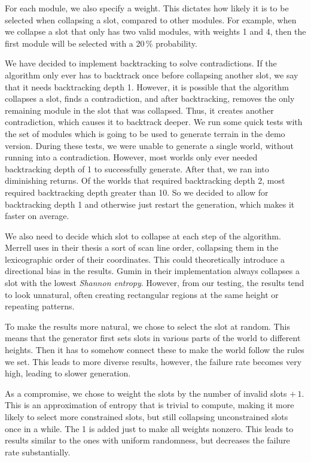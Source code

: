 For each module, we also specify a weight.
This dictates how likely it is to be selected when collapsing a slot, compared to other modules.
For example, when we collapse a slot that only has two valid modules, with weights 1 and 4, then the first module will be selected with a 20\,\% probability.

We have decided to implement backtracking to solve contradictions.
If the algorithm only ever has to backtrack once before collapsing another slot, we say that it needs backtracking depth 1.
However, it is possible that the algorithm collapses a slot, finds a contradiction, and after backtracking, removes the only remaining module in the slot that was collapsed.
Thus, it creates another contradiction, which causes it to backtrack deeper.
We run some quick tests with the set of modules which is going to be used to generate terrain in the demo version.
During these tests, we were unable to generate a single world, without running into a contradiction.
However, most worlds only ever needed backtracking depth of 1 to successfully generate.
After that, we ran into diminishing returns.
Of the worlds that required backtracking depth 2, most required backtracking depth greater than 10.
So we decided to allow for backtracking depth 1 and otherwise just restart the generation, which makes it faster on average.


We also need to decide which slot to collapse at each step of the algorithm.
Merrell uses in their thesis a sort of scan line order, collapsing them in the lexicographic order of their coordinates.
This could theoretically introduce a directional bias in the results.
Gumin in their implementation always collapses a slot with the lowest \emph{Shannon entropy}.
However, from our testing, the results tend to look unnatural, often creating rectangular regions at the same height or repeating patterns.

To make the results more natural, we chose to select the slot at random.
This means that the generator first sets slots in various parts of the world to different heights.
Then it has to somehow connect these to make the world follow the rules we set.
This leads to more diverse results, however, the failure rate becomes very high, leading to slower generation.

As a compromise, we chose to weight the slots by the number of invalid slots $+\,1$.
This is an approximation of entropy that is trivial to compute, making it more likely to select more constrained slots, but still collapsing unconstrained slots once in a while.
The 1 is added just to make all weights nonzero.
This leads to results similar to the ones with uniform randomness, but decreases the failure rate substantially.

